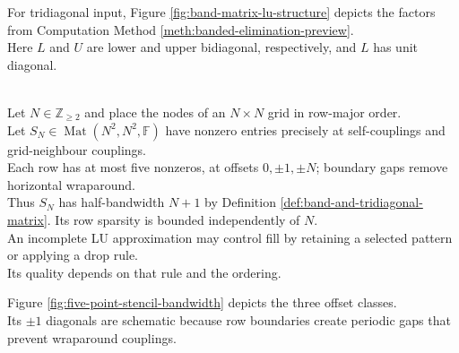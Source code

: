 For tridiagonal input, Figure \ref{fig:band-matrix-lu-structure} depicts the factors from Computation Method \ref{meth:banded-elimination-preview}.\\
Here $L$ and $U$ are lower and upper bidiagonal, respectively, and $L$ has unit diagonal.

\begin{illustrationfigure}[H]
  \centering
  
  \caption{Possible nonzeros $(*)$ in no-pivot tridiagonal elimination: $L$ and $U$ are bidiagonal.}
  \label{fig:band-matrix-lu-structure}
\end{illustrationfigure}

\begin{perspective} \label{per:five-point-stencil-bandwidth} \\
Let $N\in\mathbb{Z}_{\geq2}$ and place the nodes of an $N\times N$ grid in row-major order.\\
Let $S_N\in\operatorname{Mat}(N^2,N^2,\mathbb{F})$ have nonzero entries precisely at self-couplings and grid-neighbour couplings.\\
Each row has at most five nonzeros, at offsets $0,\pm1,\pm N$; boundary gaps remove horizontal wraparound.\\
Thus $S_N$ has half-bandwidth $N+1$ by Definition \ref{def:band-and-tridiagonal-matrix}. Its row sparsity is bounded independently of $N$.\\
An incomplete LU approximation may control fill by retaining a selected pattern or applying a drop rule.\\
Its quality depends on that rule and the ordering.
\end{perspective}

Figure \ref{fig:five-point-stencil-bandwidth} depicts the three offset classes.\\
Its $\pm1$ diagonals are schematic because row boundaries create periodic gaps that prevent wraparound couplings.

\begin{illustrationfigure}[H]
  \centering
  
  \caption{Row-major ordering places five-point couplings on the diagonals with offsets $0,\pm1,\pm N$.}
  \label{fig:five-point-stencil-bandwidth}
\end{illustrationfigure}
